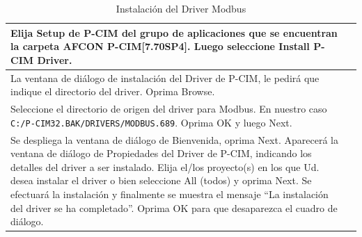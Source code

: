 \begin{table}[H]
\centering
\renewcommand*{\arraystretch}{0.3}
\begin{tabular}{*{2}{m{}}}
\hline
  Elija Setup de P-CIM del grupo de aplicaciones que se encuentran la carpeta 
  AFCON P-CIM[7.70SP4]. Luego seleccione Install P-CIM Driver.
  &\begin{center}
    \rule{0.4\textwidth}{0.3\textwidth}
  \end{center}\\
\hline
  La ventana de diálogo de instalación del Driver de P-CIM, le pedirá que 
  indique el directorio del driver.
       Oprima Browse.
  &\begin{center}
    \rule{0.4\textwidth}{0.3\textwidth}
  \end{center}\\
\hline
  Seleccione el directorio de origen del driver para Modbus. En nuestro caso 
  \texttt{C:\slash P-CIM32.BAK\slash DRIVERS\slash MODBUS.689}. Oprima OK y 
luego Next.
  &\begin{center}
    \rule{0.4\textwidth}{0.3\textwidth}
  \end{center}\\
\hline
 Se despliega la ventana de diálogo de Bienvenida, oprima Next. 
 Aparecerá la ventana de diálogo de Propiedades del Driver de 
 P-CIM, indicando los detalles del driver a ser instalado.
 Elija el/los proyecto(s) en los que Ud. desea instalar el driver o bien 
 seleccione All (todos) y oprima Next.
 Se efectuará la instalación y finalmente se muestra el mensaje “La instalación 
 del driver se ha completado”. Oprima OK para que desaparezca el cuadro de 
 diálogo.
  &\begin{center}
    \rule{0.4\textwidth}{0.3\textwidth}
  \end{center}\\
\hline
\end{tabular}
\label{tab:installModbus}
\caption{Instalación del Driver Modbus}
\end{table}


